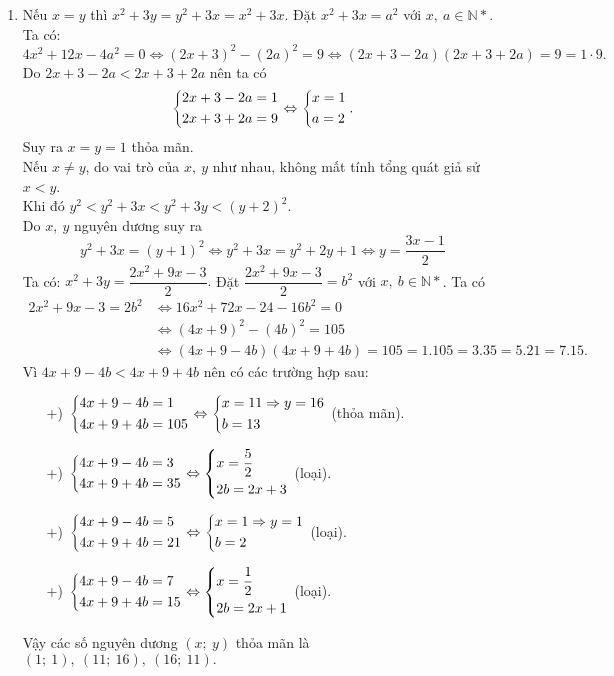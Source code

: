 \begin{bt}
{\begin{enumerate}
		\item Nếu $x = y$ thì $x^2+3y=y^2+3x=x^2+3x$. Đặt $x^2+3x=a^2$ với $x,\ a\in \mathbb{N}*$.\\
		Ta có: $$4x^2+12x-4a^2=0\Leftrightarrow (2x+3)^2-(2a)^2=9\Leftrightarrow (2x+3-2a)(2x+3+2a)=9= 1\cdot 9.$$
		Do $ 2x+3-2a<2x+3+2a$ nên ta có $$\left\{\begin{aligned}  & 2x+3-2a=1 \\  & 2x+3+2a=9 \end{aligned}\right. \Leftrightarrow \left\{\begin{aligned}  & x=1 \\  & a=2 \end{aligned}\right..$$
		Suy ra $x = y = 1$ thỏa mãn.\\
		Nếu $x \ne y$, do vai trò của $x,\ y$ như nhau, không mất tính tổng quát giả sử $x < y$.\\
		Khi đó $y^2<y^2+3x<y^2+3y<(y+2)^2$.\\
		Do $x,\ y$ nguyên dương suy ra $$y^2+3x=(y+1)^2 \Leftrightarrow y^2+3x=y^2+2y+1\Leftrightarrow y=\dfrac{3x-1}{2}$$
		Ta có: $x^2+3y=\dfrac{2x^2+9x-3}{2}.$ Đặt $\dfrac{2x^2+9x-3}{2}=b^2$   với $x,\ b\in \mathbb{N}*$. Ta có 
		$$ \begin{aligned} 2x^2+9x-3=2b^2& \Leftrightarrow 16x^2+72x-24-16b^2=0\\&
		\Leftrightarrow (4x+9)^2-(4b)^2=105\\& \Leftrightarrow (4x+9-4b)(4x+9+4b)=105=1.105=3.35=5.21=7.15 .\end{aligned}$$
		Vì $ 4x+9-4b<4x+9+4b$ nên có các trường hợp sau:
		\begin{itemize}
			\item[+)] $ \left\{\begin{aligned}  & 4x+9-4b=1 \\  & 4x+9+4b=105 \end{aligned}\right.\Leftrightarrow \left\{\begin{aligned}  & x=11\Rightarrow y=16 \\  & b=13 \end{aligned}\right.$ (thỏa mãn).
			\item[+)] $\left\{\begin{aligned}   & 4x+9-4b=3 \\  & 4x+9+4b=35\end{aligned}\right. \Leftrightarrow \left\{\begin{aligned}   & x=\dfrac{5}{2} \\ 
				& 2b=2x+3 \end{aligned}\right.$ (loại).
			\item[+)] $\left\{\begin{aligned}  & 4x+9-4b=5 \\  & 4x+9+4b=21\end{aligned}\right.
			\Leftrightarrow \left\{\begin{aligned}   & x=1\Rightarrow y=1 \\  & b=2 \end{aligned}\right.$ (loại).
			\item[+)] $\left\{\begin{aligned}  & 4x+9-4b=7 \\  & 4x+9+4b=15 \end{aligned}\right.\Leftrightarrow \left\{\begin{aligned}   & x=\dfrac{1}{2} \\ 
				& 2b=2x+1 \end{aligned}\right.$ (loại).
		\end{itemize}
		Vậy các số nguyên dương $(x;\ y)$ thỏa mãn là $(1;\ 1),\  (11;\ 16),\ (16;\ 11).$ 
	\end{enumerate}
}
\end{bt}

